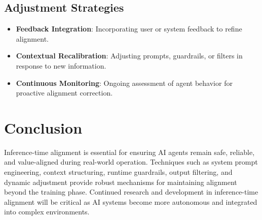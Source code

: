 \begin{TNtwocol}
\subsection{Adjustment Strategies}
\begin{itemize}
    \item \textbf{Feedback Integration}: Incorporating user or system feedback to refine alignment.
    \item \textbf{Contextual Recalibration}: Adjusting prompts, guardrails, or filters in response to new information.
    \item \textbf{Continuous Monitoring}: Ongoing assessment of agent behavior for proactive alignment correction.
\end{itemize}

\section{Conclusion}
Inference-time alignment is essential for ensuring AI agents remain safe, reliable, and value-aligned during real-world operation. Techniques such as system prompt engineering, context structuring, runtime guardrails, output filtering, and dynamic adjustment provide robust mechanisms for maintaining alignment beyond the training phase. Continued research and development in inference-time alignment will be critical as AI systems become more autonomous and integrated into complex environments.

\end{TNtwocol}
